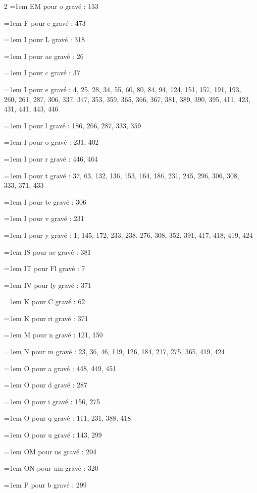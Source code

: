 \begin{multicols}{2}
\hangindent=1em EM pour o gravé : 133\par
\hangindent=1em F pour e gravé : 473\par
\hangindent=1em I pour L gravé : 318\par
\hangindent=1em I pour ae gravé : 26\par
\hangindent=1em I pour c gravé : 37\par
\hangindent=1em I pour e gravé : 4, 25, 28, 34, 55, 60, 80, 84, 94, 124, 151, 157, 191, 193, 260, 261, 287, 306, 337, 347, 353, 359, 365, 366, 367, 381, 389, 390, 395, 411, 423, 431, 441, 443, 446\par
\hangindent=1em I pour l gravé : 186, 266, 287, 333, 359\par
\hangindent=1em I pour o gravé : 231, 402\par
\hangindent=1em I pour r gravé : 446, 464\par
\hangindent=1em I pour t gravé : 37, 63, 132, 136, 153, 164, 186, 231, 245, 296, 306, 308, 333, 371, 433\par
\hangindent=1em I pour te gravé : 306\par
\hangindent=1em I pour v gravé : 231\par
\hangindent=1em I pour y gravé : 1, 145, 172, 233, 238, 276, 308, 352, 391, 417, 418, 419, 424\par
\hangindent=1em IS pour ae gravé : 381\par
\hangindent=1em IT pour Fl gravé : 7\par
\hangindent=1em IV pour ly gravé : 371\par
\hangindent=1em K pour C gravé : 62\par
\hangindent=1em K pour ri gravé : 371\par
\hangindent=1em M pour n gravé : 121, 150\par
\hangindent=1em N pour m gravé : 23, 36, 46, 119, 126, 184, 217, 275, 365, 419, 424\par
\hangindent=1em O pour a gravé : 448, 449, 451\par
\hangindent=1em O pour d gravé : 287\par
\hangindent=1em O pour i gravé : 156, 275\par
\hangindent=1em O pour q gravé : 111, 231, 388, 418\par
\hangindent=1em O pour u gravé : 143, 299\par
\hangindent=1em OM pour us gravé : 204\par
\hangindent=1em ON pour um gravé : 320\par
\hangindent=1em P pour b gravé : 299\par

\end{multicols}
